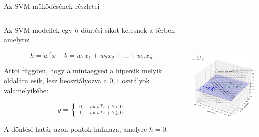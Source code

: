 \documentclass[english, aspectratio=169]{beamer}
\begin{document}
\begin{frame}{Az SVM működésének részletei}
\begin{columns}
\begin{column}{.5\textwidth}
Az SVM modellek egy $h$ döntési síkot keresnek a térben amelyre:
\begin{block}{}
\vspace{-0.5cm}
\[
h = w^Tx + b = w_1x_1 + w_2x_2 + \ldots + w_nx_n
\]
\end{block}
Attól függően, hogy a mintaegyed a hipersík melyik oldalára esik, lesz beosztályozva a $0,1$ osztályok valamelyikébe:
\begin{block}{}
\[
\hat{y} = \begin{cases}
_{1,}^{0,} & _{ha\;w^{T}x+b\geq0}^{ha\;w^{T}x+b<0}
\end{cases}
\]
\end{block}
A döntési határ azon pontok halmaza, amelyre $h=0$.
\end{column}
\begin{column}{.5\textwidth}
\begin{center}
\includegraphics[width=7cm, height=6.5cm, keepaspectratio]{images/svm_25.png}
\end{center}
\end{column}
\end{columns}
\end{frame}
\end{document}
